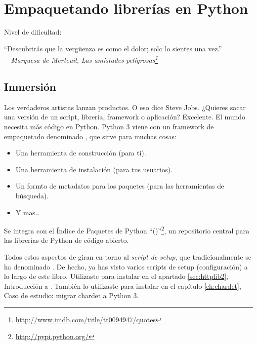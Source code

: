 
\chapter{Empaquetando librerías en Python}\label{ch:emplib}

\noindent Nivel de dificultad:\difllll

\begin{citaCap}
    ``Descubrirás que la vergüenza es como el dolor; solo lo sientes una vez.'' \\
        ---\emph{Marquesa de Merteuil, Las amistades peligrosas\footnote{\href{http://www.imdb.com/title/tt0094947/quotes}{http://www.imdb.com/title/tt0094947/quotes}}}
\end{citaCap}

\section{Inmersión}

Los verdaderos artistas lanzan productos. O eso dice Steve Jobs. ¿Quieres sacar una versión de un script, librería, framework o aplicación? Excelente. El mundo necesita más código en Python. Python 3 viene con un framework de empaquetado denominado , que sirve para muchas cosas:

\begin{itemize}
  \item Una herramienta de construcción (para ti).
  \item Una herramienta de instalación (para tus usuarios).
  \item Un formto de metadatos para los paquetes (para las herramientas de búsqueda).
  \item Y mas\ldots
\end{itemize}

Se integra con el Índice de Paquetes de Python ``()''\footnote{\href{http://pypi.python.org/}{http://pypi.python.org/}}, un repositorio central para las librerías de Python de código abierto.

Todos estos aspectos de  giran en torno al \emph{script de setup}, que tradicionalmente se ha denominado . De hecho, ya has visto varios scripts de setup (configuración) a lo largo de este libro. Utilizaste  para instalar  en el apartado \ref{sec:httplib2}, Introducción a . También lo utilizaste para instalar  en el capítulo \ref{ch:chardet}, Caso de estudio: migrar chardet a Python 3.


